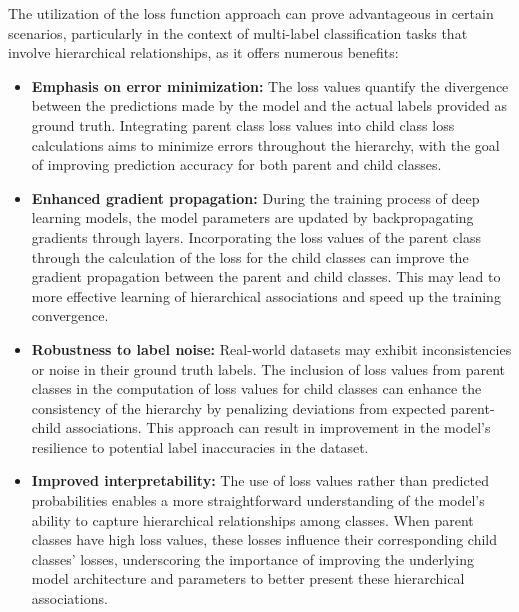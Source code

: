 \documentclass[authoryear,preprint,review,12pt]{elsarticle}
\begin{document}
The utilization of the loss function approach can prove advantageous in certain scenarios, particularly in the context of multi-label classification tasks that involve hierarchical relationships, as it offers numerous benefits:
\begin{itemize}
    \item \textbf{Emphasis on error minimization:} The loss values quantify the divergence between the predictions made by the model and the actual labels provided as ground truth. Integrating parent class loss values into child class loss calculations aims to minimize errors throughout the hierarchy, with the goal of improving prediction accuracy for both parent and child classes.
    \item \textbf{Enhanced gradient propagation:} During the training process of deep learning models, the model parameters are updated by backpropagating gradients through layers. Incorporating the loss values of the parent class through the calculation of the loss for the child classes can improve the gradient propagation between the parent and child classes. This may lead to more effective learning of hierarchical associations and speed up the training convergence.
    \item \textbf{Robustness to label noise:} Real-world datasets may exhibit inconsistencies or noise in their ground truth labels. The inclusion of loss values from parent classes in the computation of loss values for child classes can enhance the consistency of the hierarchy by penalizing deviations from expected parent-child associations. This approach can result in improvement in the model's resilience to potential label inaccuracies in the dataset.
    \item \textbf{Improved interpretability:} The use of loss values rather than predicted probabilities enables a more straightforward understanding of the model's ability to capture hierarchical relationships among classes. When parent classes have high loss values, these losses influence their corresponding child classes' losses, underscoring the importance of improving the underlying model architecture and parameters to better present these hierarchical associations.
\end{itemize}
\end{document}
